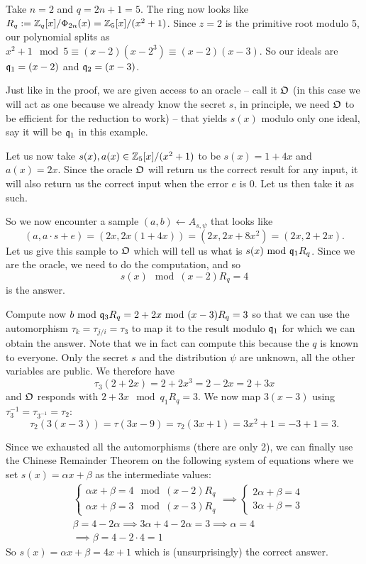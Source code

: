\begin{example}
	Take $n = 2$ and $q = 2n+1 = 5$. The ring now looks like $R_q := \mathbb{Z}_q[x]/\Phi_{2n}(x) = \mathbb{Z}_5[x]/(x^2+1)$. Since $z = 2$ is the primitive root modulo 5, our polynomial splits as $x^2+1 \mod 5 \equiv (x-2)(x-2^3) \equiv (x-2)(x-3)$. So our ideals are $\mathfrak{q}_1 = (x-2)$ and $\mathfrak{q}_2 = (x-3)$.

	Just like in the proof, we are given access to an oracle -- call it $\mathfrak{O}$ (in this case we will act as one because we already know the secret $s$, in principle, we need $\mathfrak{O}$ to be efficient for the reduction to work) -- that yields $s(x)$ modulo only one ideal, say it will be $\mathfrak{q}_1$ in this example.

	Let us now take $s(x), a(x) \in \mathbb{Z}_5[x]/(x^2+1)$ to be $s(x) = 1 + 4x$ and $a(x) = 2x$. Since the oracle $\mathfrak{O}$ will return us the correct result for any input, it will also return us the correct input when the error $e$ is 0. Let us then take it as such.

	So we now encounter a sample $(a,b) \leftarrow A_{s, \psi}$ that looks like 
	\[ (a, a\cdot s + e) = (2x, 2x(1+4x)) = (2x, 2x +8x^2) = (2x, 2+2x). \]
	Let us give this sample to $\mathfrak{O}$ which will tell us what is $s(x) \text{ mod } \mathfrak{q}_1 R_q$. Since we are the oracle, we need to do the computation, and so
	\[ s(x) \mod (x-2)R_q = 4 \]
	is the answer.

	Compute now $b \text{ mod } \mathfrak{q}_3 R_q = 2 +2x \text{ mod } (x-3)R_q = 3$ so that we can use the automorphism $\tau_k = \tau_{j/i} = \tau_3$ to map it to the result modulo $\mathfrak{q}_1$ for which we can obtain the answer. Note that we in fact can compute this because the $q$ is known to everyone. Only the secret $s$ and the distribution $\psi$ are unknown, all the other variables are public. We therefore have
	\[ \tau_3(2+2x) = 2 +2x^3 = 2 -2x = 2+3x \]
	and $\mathfrak{O}$ responds with $2+3x \mod q_1 R_q = 3$. We now map $3(x-3)$ using $\tau_3^{-1} = \tau_{3^{-1}} = \tau_2$:
	\[ \tau_2(3(x-3)) = \tau(3x-9) = \tau_2(3x+1) = 3x^2 + 1 = -3 +1 = 3. \]

	Since we exhausted all the automorphisms (there are only 2), we can finally use the Chinese Remainder Theorem on the following system of equations where we set $s(x) = \alpha x + \beta$ as the intermediate values:
	\begin{align*} & \begin{cases}
		\alpha x + \beta = 4 \mod (x-2)R_q \\
		\alpha x + \beta = 3 \mod (x-3)R_q
	\end{cases} \implies 
	\begin{cases} 
		2 \alpha + \beta = 4 \\
		3 \alpha + \beta = 3
	\end{cases} \\
				   & \beta = 4 - 2 \alpha \implies 3 \alpha + 4 - 2 \alpha = 3 \implies \alpha = 4 \\
				   & \implies \beta = 4-2\cdot 4 = 1
\end{align*}
So $s(x) = \alpha x + \beta = 4x + 1$ which is (unsurprisingly) the correct answer.	
\end{example}
